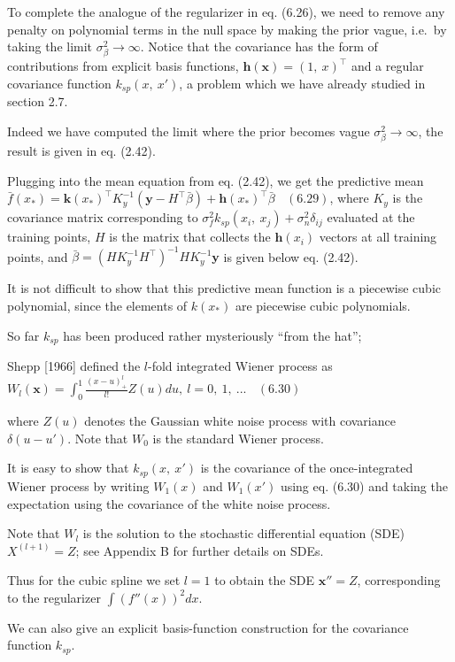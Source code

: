 \documentclass[
  ignorenonframetext,
]{beamer}
\begin{document}
\begin{frame}{}
\protect\hypertarget{section-22}{}
To complete the analogue of the regularizer in eq. (6.26), we need to
remove any penalty on polynomial terms in the null space by making the
prior vague, i.e.~by taking the limit
\(\sigma_\beta^2 \rightarrow \infty\). Notice that the covariance has
the form of contributions from explicit basis functions,
\(\pmb h(\pmb x) = (1,\ x)^{\top}\) and a regular covariance function
\(k_{sp}(x,\ x')\), a problem which we have already studied in section
2.7.

Indeed we have computed the limit where the prior becomes vague
\(\sigma_\beta^2 \rightarrow \infty\), the result is given in eq.
(2.42).

Plugging into the mean equation from eq. (2.42), we get the predictive
mean
\(\bar f(x_*) = \pmb k(x_*)^{\top} K_y^{−1} (\pmb y − H^{\top} \bar \beta) + \pmb h(x_*)^{\top} \bar \beta\ \ \ \ (6.29)\),
where \(K_y\) is the covariance matrix corresponding to
\(\sigma_f^2 k_{sp}(x_i,\ x_j) + \sigma_ n^2 \delta_{ij}\) evaluated at
the training points, \(H\) is the matrix that collects the
\(\pmb h(x_i)\) vectors at all training points, and
\(\bar \beta = (HK_y^{−1}H^{\top})^{−1} H K_y^{−1}\pmb y\) is given
below eq. (2.42).
\end{frame}

\begin{frame}{}
\protect\hypertarget{section-23}{}
It is not difficult to show that this predictive mean function is a
piecewise cubic polynomial, since the elements of \(k(x_*)\) are
piecewise cubic polynomials.

So far \(k_{sp}\) has been produced rather mysteriously ``from the
hat'';

Shepp {[}1966{]} defined the \(l\)-fold integrated Wiener process as
\(W_l(\pmb x) = \int_0^1 \frac {(x − u)^l_+} {l!} Z(u)du,\ l = 0,\ 1,\ . . .\ \ \ \ (6.30)\)

where \(Z(u)\) denotes the Gaussian white noise process with covariance
\(\delta (u−u')\). Note that \(W_0\) is the standard Wiener process.

It is easy to show that \(k_{sp} (x,\ x')\) is the covariance of the
once-integrated Wiener process by writing \(W_1(x)\) and \(W_1(x')\)
using eq. (6.30) and taking the expectation using the covariance of the
white noise process.

Note that \(W_l\) is the solution to the stochastic differential
equation (SDE) \(X^{(l+1)} = Z\); see Appendix B for further details on
SDEs.

Thus for the cubic spline we set \(l = 1\) to obtain the SDE
\(\pmb x'' = Z\), corresponding to the regularizer
\(\int (f''(x))^2dx\).

We can also give an explicit basis-function construction for the
covariance function \(k_{sp}\).
\end{frame}
\end{document}
